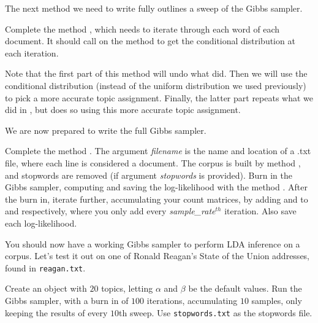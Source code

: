 The next method we need to write fully outlines a sweep of the Gibbs sampler.

\begin{problem}
Complete the method , which needs to iterate through each word of each document. It should call on the method  to get the conditional distribution at each iteration.

Note that the first part of this method will undo what  did.
Then we will use the conditional distribution (instead of the uniform distribution we used previously) to pick a more accurate topic assignment.
Finally, the latter part repeats what we did in , but does so using this more accurate topic assignment.
\end{problem}

We are now prepared to write the full Gibbs sampler.

\begin{problem}
Complete the method .
The argument \emph{filename} is the name and location of a .txt file, where each line is considered a document.
The corpus is built by method , and stopwords are removed (if argument \emph{stopwords} is provided).
Burn in the Gibbs sampler, computing and saving the log-likelihood with the method .
After the burn in, iterate further, accumulating your count matrices, by adding  and  to  and  respectively, where you only add every \emph{sample\_rate}$^{th}$ iteration.
Also save each log-likelihood.
\end{problem}

You should now have a working Gibbs sampler to perform LDA inference on a corpus.
Let's test it out on one of Ronald Reagan's State of the Union addresses, found in \texttt{reagan.txt}.

\begin{problem}

Create an  object with $20$ topics, letting $\alpha$ and $\beta$ be the default values.
Run the Gibbs sampler, with a burn in of $100$ iterations, accumulating $10$ samples, only keeping the results of every $10$th sweep.
Use \texttt{stopwords.txt} as the stopwords file.
\end{problem}

